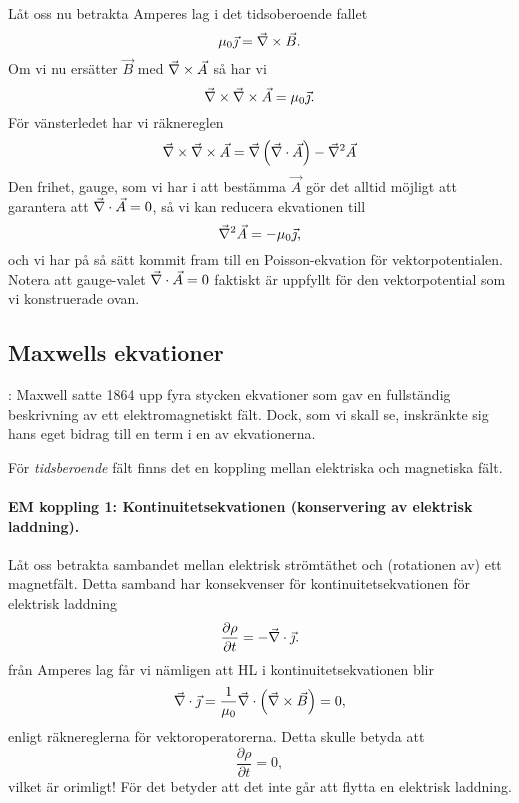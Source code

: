 \documentclass[%
oneside,                 %
final,                   %
10pt]{article}
\newcommand{\longinlinecomment}[3]{{\color{red}{\bf #1}: #2}}
\newenvironment{notice_mdfboxadmon}[1][]{
\begin{notice_mdfboxmdframed}[frametitle=#1]
}
{
\end{notice_mdfboxmdframed}
}
\begin{document}
\begin{notice_mdfboxadmon}
Låt oss nu betrakta Amperes lag i det tidsoberoende fallet
\begin{equation}
  \mu_0 \vec{\jmath} =  \vec{\nabla} \times \vec{B}.
\end{equation}
Om vi nu ersätter $\vec{B}$ med $\vec{\nabla} \times \vec{A}$ så har vi
\begin{equation}
  \vec{\nabla} \times \vec{\nabla} \times \vec{A} = \mu_0\vec{\jmath}.
\end{equation}
För vänsterledet har vi räknereglen
\begin{equation}
  \vec{\nabla} \times \vec{\nabla} \times \vec{A} =
\vec{\nabla}\left(\vec{\nabla}\cdot\vec{A}\right) -\vec{\nabla}^2\vec{A}
\end{equation}
Den frihet, gauge, som vi har i att bestämma $\vec{A}$ gör det alltid möjligt att garantera att $\vec{\nabla} \cdot \vec{A} = 0$, så vi kan reducera ekvationen till
\begin{equation}
  \vec{\nabla}^2 \vec{A} = -\mu_0 \vec{\jmath},
\end{equation}
och vi har på så sätt kommit fram till en Poisson-ekvation för vektorpotentialen. Notera att gauge-valet $\vec{\nabla} \cdot \vec{A} = 0$ faktiskt är uppfyllt för den vektorpotential som vi konstruerade ovan.
\end{notice_mdfboxadmon} %



\subsection*{Maxwells ekvationer}

\longinlinecomment{Kommentar 2}{ Maxwell satte 1864 upp fyra stycken ekvationer som gav en fullständig beskrivning av ett elektromagnetiskt fält.  Dock, som vi skall se, inskränkte sig hans eget bidrag till en term i en av ekvationerna. }{ Maxwell satte 1864 upp }

För \emph{tidsberoende} fält finns det en koppling mellan elektriska och magnetiska fält. 

\paragraph{EM koppling 1: Kontinuitetsekvationen (konservering av elektrisk laddning).}
Låt oss betrakta sambandet mellan elektrisk strömtäthet och (rotationen av) ett magnetfält. Detta samband har konsekvenser för kontinuitetsekvationen för elektrisk laddning
$$
  \frac{\partial \rho}{\partial t} = - \vec{\nabla} \cdot \vec{\jmath}.
$$
från Amperes lag får vi nämligen att HL i kontinuitetsekvationen blir
$$
  \vec{\nabla} \cdot \vec{\jmath} = \frac{1}{\mu_0} \vec{\nabla} \cdot \left(\vec{\nabla} \times
\vec{B}\right) = 0,
$$
enligt räknereglerna för vektoroperatorerna. Detta skulle betyda att
$$
  \frac{\partial \rho}{\partial t} = 0,
$$
vilket är orimligt! 
För det betyder att det inte går att flytta en elektrisk laddning.  
\end{document}
